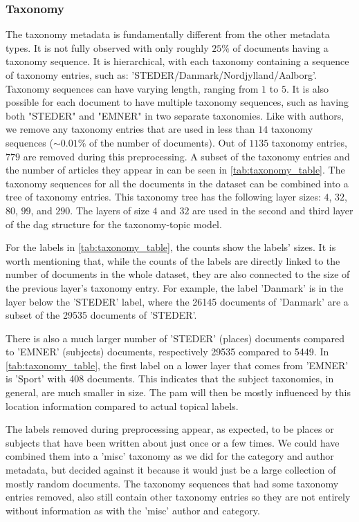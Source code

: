 \subsubsection{Taxonomy}\label{subsec:appendix_taxonomy}
The taxonomy metadata is fundamentally different from the other metadata types.
It is not fully observed with only roughly $25\%$ of documents having a taxonomy sequence.
It is hierarchical, with each taxonomy containing a sequence of taxonomy entries, such as: 'STEDER/Danmark/Nordjylland/Aalborg'.
Taxonomy sequences can have varying length, ranging from $1$ to $5$.
It is also possible for each document to have multiple taxonomy sequences, such as having both "STEDER" and "EMNER" in two separate taxonomies.
Like with authors, we remove any taxonomy entries that are used in less than $14$ taxonomy sequences (${\sim}0.01\%$ of the number of documents).
Out of $1135$ taxonomy entries, $779$ are removed during this preprocessing.
A subset of the taxonomy entries and the number of articles they appear in can be seen in \autoref{tab:taxonomy_table}.
The taxonomy sequences for all the documents in the dataset can be combined into a tree of taxonomy entries.
This taxonomy tree has the following layer sizes: $4$, $32$, $80$, $99$, and $290$.
The layers of size $4$ and $32$ are used in the second and third layer of the \gls{dag} structure for the taxonomy-topic model.

For the labels in \autoref{tab:taxonomy_table}, the counts show the labels' sizes.
It is worth mentioning that, while the counts of the labels are directly linked to the number of documents in the whole dataset, they are also connected to the size of the previous layer's taxonomy entry.
For example, the label 'Danmark' is in the layer below the 'STEDER' label, where the 26145 documents of 'Danmark' are a subset of the 29535 documents of 'STEDER'.

There is also a much larger number of 'STEDER' (places) documents compared to 'EMNER' (subjects) documents, respectively 29535 compared to 5449.
In \autoref{tab:taxonomy_table}, the first label on a lower layer that comes from 'EMNER' is 'Sport' with 408 documents.
This indicates that the subject taxonomies, in general, are much smaller in size.
The \gls{pam} will then be mostly influenced by this location information compared to actual topical labels.

The labels removed during preprocessing appear, as expected, to be places or subjects that have been written about just once or a few times.
We could have combined them into a 'misc' taxonomy as we did for the category and author metadata, but decided against it because it would just be a large collection of mostly random documents.
The taxonomy sequences that had some taxonomy entries removed, also still contain other taxonomy entries so they are not entirely without information as with the 'misc' author and category.

